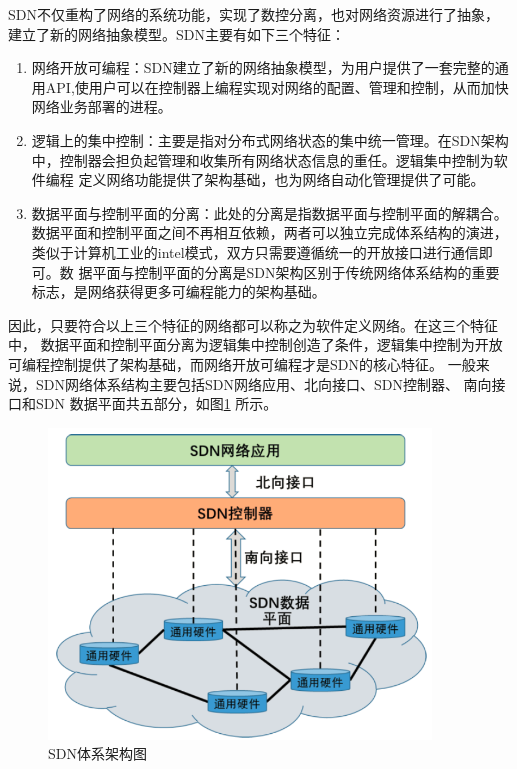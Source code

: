 
SDN不仅重构了网络的系统功能，实现了数控分离，也对网络资源进行了抽象，建立了新的网络抽象模型。SDN主要有如下三个特征：
\begin{enumerate}
  \item 网络开放可编程：SDN建立了新的网络抽象模型，为用户提供了一套完整的通用API,使用户可以在控制器上编程实现对网络的配置、管理和控制，从而加快网络业务部署的进程。
  \item 逻辑上的集中控制：主要是指对分布式网络状态的集中统一管理。在SDN架构中，控制器会担负起管理和收集所有网络状态信息的重任。逻辑集中控制为软件编程 定义网络功能提供了架构基础，也为网络自动化管理提供了可能。
  \item 数据平面与控制平面的分离：此处的分离是指数据平面与控制平面的解耦合。 数据平面和控制平面之间不再相互依赖，两者可以独立完成体系结构的演进，类似于计算机工业的intel模式，双方只需要遵循统一的开放接口进行通信即可。数 据平面与控制平面的分离是SDN架构区别于传统网络体系结构的重要标志，是网络获得更多可编程能力的架构基础。
\end{enumerate}

因此，只要符合以上三个特征的网络都可以称之为软件定义网络。在这三个特征中， 数据平面和控制平面分离为逻辑集中控制创造了条件，逻辑集中控制为开放可编程控制提供了架构基础，而网络开放可编程才是SDN的核心特征。
一般来说，SDN网络体系结构主要包括SDN网络应用、北向接口、SDN控制器、 南向接口和SDN 数据平面共五部分，如图\ref{fig:SDNArchitectureDiagram} 所示。

\begin{figure}[htbp]
\centering
\includegraphics[width=4.0in]{figures/SDNArchitectureDiagram}
  \caption{SDN体系架构图}
  \label{fig:SDNArchitectureDiagram}
\end{figure}


